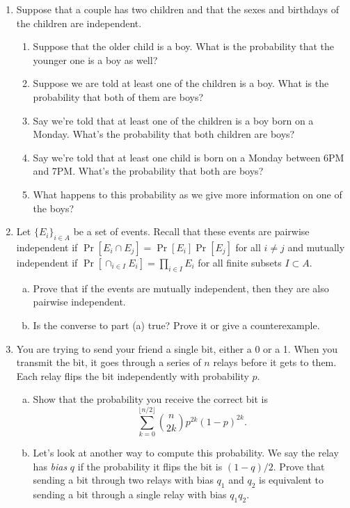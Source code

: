 \documentclass[11pt,letterpaper]{report}
\begin{document}
\begin{enumerate}
	\item Suppose that a couple has two children and that the sexes and birthdays of the children are independent.
	\begin{enumerate}
		\item Suppose that the older child is a boy. What is the probability that the younger one is a boy as well?
		\item Suppose we are told at least one of the children is a boy. What is the probability that both of them are boys?
		\item Say we're told that at least one of the children is a boy born on a Monday. What's the probability that both children are boys?
		\item Say we're told that at least one child is born on a Monday between 6PM and 7PM. What's the probability that both are boys?
		\item What happens to this probability as we give more information on one of the boys?
	\end{enumerate}

	\item Let $\{E_i\}_{i\in A}$ be a set of events. Recall that these events are pairwise independent if $\Pr[E_i\cap E_j] = \Pr[E_i]\Pr[E_j]$ for all $i\neq j$ and mutually independent if $\Pr[\cap_{i\in I}E_i] = \prod_{i\in I}E_i$ for all finite subsets $I\subset A$.
	\begin{enumerate}[(a)]
		\item Prove that if the events are mutually independent, then they are also pairwise independent.
		\item Is the converse to part (a) true? Prove it or give a counterexample.
	\end{enumerate}

	\item You are trying to send your friend a single bit, either a 0 or a 1. When you transmit the bit, it goes through a series of $n$ relays before it gets to them. Each relay flips the bit independently with probability $p$.
	\begin{enumerate}[(a)]
		\item Show that the probability you receive the correct bit is
		\[
		\sum_{k=0}^{\lfloor n/2\rfloor}\binom{n}{2k}p^{2k}(1-p)^{2k}.
		\]

		\item Let's look at another way to compute this probability. We say the relay has \textit{bias} $q$ if the probability it flips the bit is $(1-q)/2$. Prove that sending a bit through two relays with bias $q_1$ and $q_2$ is equivalent to sending a bit through a single relay with bias $q_1q_2$.


\end{enumerate}
\end{enumerate}
\end{document}
